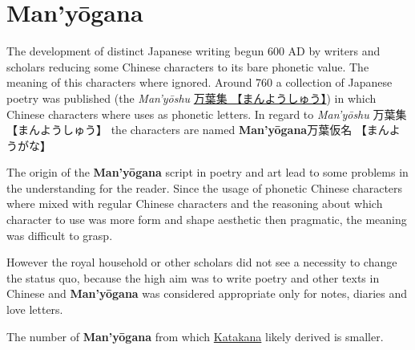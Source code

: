 \section{Man'yōgana}
\label{sec:Manyogana}
\label{sec:Manyoshu}

The development of distinct Japanese writing begun 600 AD by writers and
scholars reducing some Chinese characters to its bare phonetic value. The
meaning of this characters where ignored. Around 760 a collection of Japanese
poetry was published (the \textit{Man'yōshu} \Link
\href{https://en.wikipedia.org/wiki/Man%27y%C5%8Dsh%C5%AB}{万葉集
【まんようしゅう】}) in which Chinese characters where uses as phonetic
letters. In regard to \textit{Man'yōshu} {万葉集} {【まんようしゅう】} the
characters are named \textbf{Man'yōgana}{万葉仮名} {【まんようがな】}

The origin of the \textbf{Man'yōgana} script in poetry and art lead to some
problems in the understanding for the reader. Since the usage of phonetic
Chinese characters where mixed with regular Chinese characters and the
reasoning about which character to use was more form and shape aesthetic then
pragmatic, the meaning was difficult to grasp.

However the royal household or other scholars did not see a necessity to change
the status quo, because the high aim was to write poetry and other texts in
Chinese and \textbf{Man'yōgana} was considered appropriate only for notes,
diaries and love letters.


The number of \textbf{Man'yōgana} from which \hyperref[sec:Katakana]{Katakana}
likely derived is smaller.

